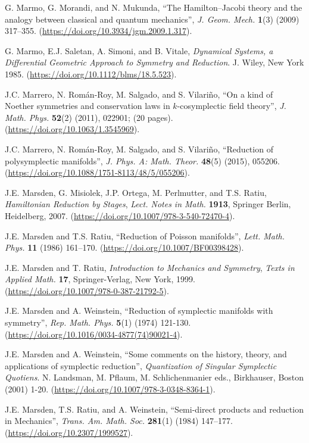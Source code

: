 \documentclass[12pt]{report}
\begin{document}
\begin{thebibliography}{999}
G. Marmo, G. Morandi, and N. Mukunda, 
``The Hamilton--Jacobi theory
and the analogy between classical and quantum mechanics'', 
{\sl J. Geom. Mech.} {\bf 1}(3) (2009) 317--355.
(\url{https://doi.org/10.3934/jgm.2009.1.317}).

G. Marmo, E.J. Saletan, A. Simoni, and B. Vitale,
{\it Dynamical Systems, a Differential Geometric Approach to Symmetry
and Reduction}.
J. Wiley, New York 1985.
(\url{https://doi.org/10.1112/blms/18.5.523}).

J.C. Marrero, N. Rom\'{a}n-Roy, M. Salgado, and S. Vilari\~no,
``On a kind of Noether symmetries and conservation laws in $k$-cosymplectic field theory'',
 {\sl J. Math. Phys.} {\bf 52}(2) (2011), 022901; (20 pages).
(\url{https://doi.org/10.1063/1.3545969}).

J.C. Marrero, N. Rom\'{a}n-Roy, M. Salgado, and S. Vilari\~no,
``Reduction of polysymplectic manifolds'',
 {\sl J. Phys. A: Math. Theor.} {\bf 48}(5) (2015), 055206.
(\url{https://doi.org/10.1088/1751-8113/48/5/055206}).

J.E. Marsden, G. Misiolek, J.P. Ortega, M. Perlmutter, and T.S. Ratiu,
{\it Hamiltonian Reduction by Stages},
{\sl Lect. Notes in Math.} {\bf 1913},
Springer Berlin, Heidelberg, 2007.
(\url{https://doi.org/10.1007/978-3-540-72470-4}).

J.E. Marsden and T.S. Ratiu,
``Reduction of Poisson manifolds'',
{\sl Lett. Math. Phys.} {\bf 11} (1986) 161--170.
(\url{https://doi.org/10.1007/BF00398428}).

J.E. Marsden and T. Ratiu, 
{\it Introduction to Mechanics and Symmetry},
{\sl Texts in Applied Math.} {\bf 17},
Springer-Verlag, New York, 1999.
(\url{https://doi.org/10.1007/978-0-387-21792-5}).

J.E. Marsden and A. Weinstein, ``Reduction of symplectic manifolds with symmetry'',
{\sl Rep. Math. Phys.} {\bf 5}(1) (1974) 121-130.
(\url{https://doi.org/10.1016/0034-4877(74)90021-4}).

J.E. Marsden and A. Weinstein, 
``Some comments on the history, theory, and applications of symplectic reduction'',
{\sl Quantization of Singular Symplectic Quotiens}.
N. Landsman, M. Pflaum, M. Schlichenmanier eds., Birkhauser, Boston (2001) 1-20.
(\url{https://doi.org/10.1007/978-3-0348-8364-1}).

J.E. Marsden, T.S. Ratiu, and A. Weinstein,
``Semi-direct products and reduction in Mechanics'',
{\sl Trans. Am. Math. Soc.} {\bf 281}(1) (1984) 147--177.
(\url{https://doi.org/10.2307/1999527}).


\end{thebibliography}
\end{document}
